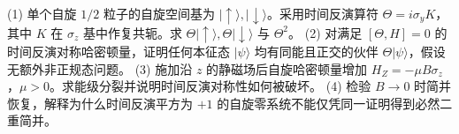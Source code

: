 (1) 单个自旋 \(1/2\) 粒子的自旋空间基为 \(|\uparrow\rangle,|\downarrow\rangle\)。采用时间反演算符 \(\Theta=i\sigma_yK\)，其中 \(K\) 在 \(\sigma_z\) 基中作复共轭。求 \(\Theta|\uparrow\rangle,\Theta|\downarrow\rangle\) 与 \(\Theta^2\)。
(2) 对满足 \([\Theta,H]=0\) 的时间反演对称哈密顿量，证明任何本征态 \(|\psi\rangle\) 均有同能且正交的伙伴 \(\Theta|\psi\rangle\)，假设无额外非正规态问题。
(3) 施加沿 \(z\) 的静磁场后自旋哈密顿量增加 \(H_Z=-\mu B\sigma_z\)，\(\mu>0\)。求能级分裂并说明时间反演对称性如何被破坏。
(4) 检验 \(B\to0\) 时简并恢复，解释为什么时间反演平方为 \(+1\) 的自旋零系统不能仅凭同一证明得到必然二重简并。
